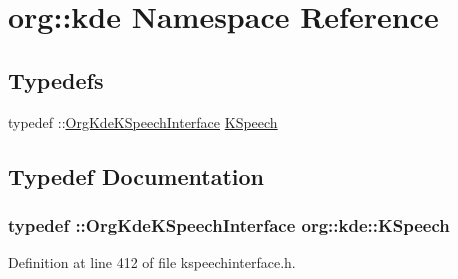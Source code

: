 \hypertarget{namespaceorg_1_1kde}{\section{org\+:\+:kde Namespace Reference}
\label{namespaceorg_1_1kde}
}
\subsection*{Typedefs}
\begin{DoxyCompactItemize}
\item 
typedef \+::\hyperlink{classOrgKdeKSpeechInterface}{Org\+Kde\+K\+Speech\+Interface} \hyperlink{namespaceorg_1_1kde_a660da8eeb8f371be9650137642072d62}{K\+Speech}
\end{DoxyCompactItemize}


\subsection{Typedef Documentation}
\hypertarget{namespaceorg_1_1kde_a660da8eeb8f371be9650137642072d62}{
\subsubsection[{K\+Speech}]{\setlength{\rightskip}{0pt plus 5cm}typedef \+::{\bf Org\+Kde\+K\+Speech\+Interface} {\bf org\+::kde\+::\+K\+Speech}}}\label{namespaceorg_1_1kde_a660da8eeb8f371be9650137642072d62}


Definition at line 412 of file kspeechinterface.\+h.

